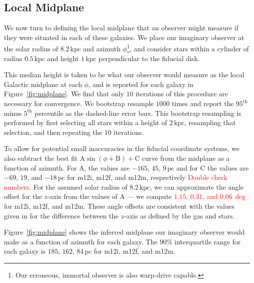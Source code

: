 \documentclass[twocolumn]{aastex62}
\newcommand{\Gus}[1]{\textcolor{red}{#1}}
\newcommand{\pc}{\text{pc}}
\newcommand{\kpc}{\text{kpc}}
\begin{document}
\subsection{Local Midplane} \label{sec:local_midplane}
We now turn to defining the local midplane that an observer might measure if
they were situated in each of these galaxies. We place our imaginary observer
at the solar radius of $8.2\,\kpc$ and azimuth $\phi$\footnote{Our erroneous,
immortal observer is also warp-drive capable.}, and consider stars within a
cylinder of radius $0.5\,\kpc$ and height $1\,\kpc$ perpendicular to the
fiducial disk.

This median height is taken to be what our observer would measure as the local
Galactic midplane at each $\phi$, and is reported for each galaxy in
Figure~\ref{fig:midplane}. We find that only $10$ iterations of this procedure
are necessary for convergence. We bootstrap resample $1000$ times and report
the $95^{\text{th}}$ minus $5^{\text{th}}$ percentile as the dashed-line error
bars. This bootstrap resampling is performed by first selecting all stars
within a height of $2\,\kpc$, resampling that selection, and then repeating
the $10$ iterations.

To allow for potential small inaccuracies in the fiducial coordinate systems,
we also subtract the best fit $\text{A} \sin{\left(\phi + \text{B}\right)} +
\text{C}$ curve from the midplane as a function of azimuth. For $\text{A}$,
the values are $-165$, $45$, $9\,\pc$ and for $\text{C}$ the values are $-69$,
$19$, and $-18\,\pc$ for m12i, m12f, and m12m, respectively \Gus{Double check
numbers}. For the assumed solar radius of $8.2\,\kpc$, we can approximate the
angle offset for the $z$-axis from the values of $\text{A}$ --- we compute
\Gus{$1.15$, $0.31$, and $0.06\,\deg$} for m12i, m12f, and m12m. These angle
offsets are consistent with the values given in \citet{2018arXiv180610564S}
for the difference between the $z$-axis as defined by the gas and stars.

Figure~\ref{fig:midplane} shows the inferred midplane our imaginary observer
would make as a function of azimuth for each galaxy. The $90\%$ interquartile
range for each galaxy is $185$, $162$, $84\,\pc$ for m12i, m12f, and m12m. 

\begin{figure*}
\caption{Caption.}
\label{fig:midplane}
\end{figure*}

\end{document}
